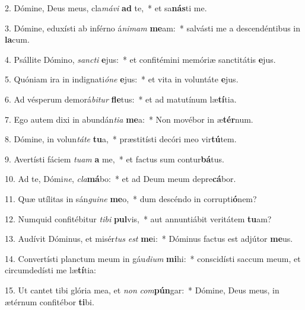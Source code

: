 2. Dómine, Deus meus, cla\textit{má}\textit{vi} \textbf{ad} te,~*  et sa\textbf{nás}ti me.\

3. Dómine, eduxísti ab inférno á\textit{ni}\textit{mam} \textbf{me}am:~*  salvásti me a descendéntibus in \textbf{la}cum.\

4. Psállite Dómino, \textit{sanc}\textit{ti} \textbf{e}jus:~*  et confitémini memóriæ sanctitátis \textbf{e}jus.\

5. Quóniam ira in indignati\textit{ó}\textit{ne} \textbf{e}jus:~*  et vita in voluntáte \textbf{e}jus.\

6. Ad vésperum demorá\textit{bi}\textit{tur} \textbf{fle}tus:~*  et ad matutínum læ\textbf{tí}tia.\

7. Ego autem dixi in abundán\textit{ti}\textit{a} \textbf{me}a:~*  Non movébor in æ\textbf{tér}num.\

8. Dómine, in volun\textit{tá}\textit{te} \textbf{tu}a,~*  præstitísti decóri meo vir\textbf{tú}tem.\

9. Avertísti fáciem \textit{tu}\textit{am} \textbf{a} me,~*  et factus sum contur\textbf{bá}tus.\

10. Ad te, Dómi\textit{ne}, \textit{cla}\textbf{má}bo:~*  et ad Deum meum depre\textbf{cá}bor.\

11. Quæ utílitas in sán\textit{gui}\textit{ne} \textbf{me}o,~*  dum descéndo in corrupti\textbf{ó}nem?\

12. Numquid confitébitur \textit{ti}\textit{bi} \textbf{pul}vis,~*  aut annuntiábit veritátem \textbf{tu}am?\

13. Audívit Dóminus, et misér\textit{tus} \textit{est} \textbf{me}i:~*  Dóminus factus est adjútor \textbf{me}us.\

14. Convertísti planctum meum in gáu\textit{di}\textit{um} \textbf{mi}hi:~*  conscidísti saccum meum, et circumdedísti me læ\textbf{tí}tia:\

15. Ut cantet tibi glória mea, et \textit{non} \textit{com}\textbf{pún}gar:~*  Dómine, Deus meus, in ætérnum confitébor \textbf{ti}bi.\

